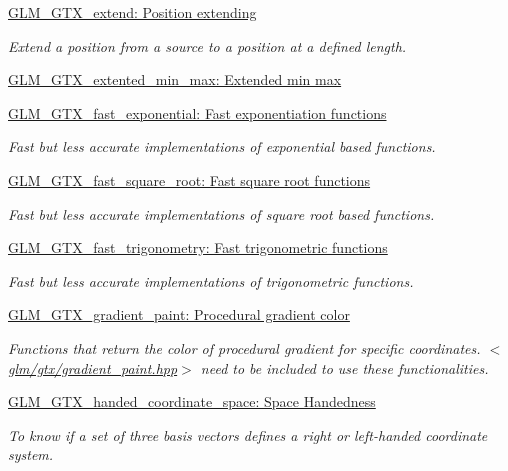 \begin{DoxyCompactItemize}
\hyperlink{group__gtx__extend}{\-G\-L\-M\-\_\-\-G\-T\-X\-\_\-extend\-: Position extending}
\begin{DoxyCompactList}\small\item\em \-Extend a position from a source to a position at a defined length. \end{DoxyCompactList}\item 
\hyperlink{group__gtx__extented__min__max}{\-G\-L\-M\-\_\-\-G\-T\-X\-\_\-extented\-\_\-min\-\_\-max\-: Extended min max}
\item 
\hyperlink{group__gtx__fast__exponential}{\-G\-L\-M\-\_\-\-G\-T\-X\-\_\-fast\-\_\-exponential\-: Fast exponentiation functions}
\begin{DoxyCompactList}\small\item\em \-Fast but less accurate implementations of exponential based functions. \end{DoxyCompactList}\item 
\hyperlink{group__gtx__fast__square__root}{\-G\-L\-M\-\_\-\-G\-T\-X\-\_\-fast\-\_\-square\-\_\-root\-: Fast square root functions}
\begin{DoxyCompactList}\small\item\em \-Fast but less accurate implementations of square root based functions. \end{DoxyCompactList}\item 
\hyperlink{group__gtx__fast__trigonometry}{\-G\-L\-M\-\_\-\-G\-T\-X\-\_\-fast\-\_\-trigonometry\-: Fast trigonometric functions}
\begin{DoxyCompactList}\small\item\em \-Fast but less accurate implementations of trigonometric functions. \end{DoxyCompactList}\item 
\hyperlink{group__gtx__gradient__paint}{\-G\-L\-M\-\_\-\-G\-T\-X\-\_\-gradient\-\_\-paint\-: Procedural gradient color}
\begin{DoxyCompactList}\small\item\em \-Functions that return the color of procedural gradient for specific coordinates. $<$\hyperlink{gradient__paint_8hpp}{glm/gtx/gradient\-\_\-paint.\-hpp}$>$ need to be included to use these functionalities. \end{DoxyCompactList}\item 
\hyperlink{group__gtx__handed__coordinate__space}{\-G\-L\-M\-\_\-\-G\-T\-X\-\_\-handed\-\_\-coordinate\-\_\-space\-: Space Handedness}
\begin{DoxyCompactList}\small\item\em \-To know if a set of three basis vectors defines a right or left-\/handed coordinate system. \end{DoxyCompactList}\item 

\end{DoxyCompactItemize}
